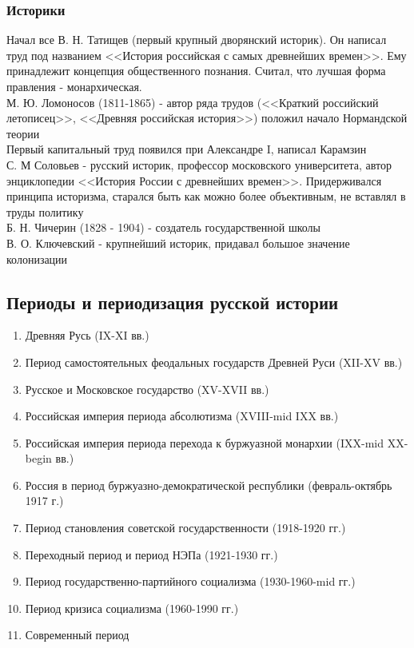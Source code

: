 \documentclass[a4paper, 11pt, oneside]{article}
\begin{document}
\subsubsection{Историки}
Начал все В. Н. Татищев (первый крупный дворянский историк). Он написал труд под названием 
<<История российская с самых древнейших времен>>. Ему принадлежит концепция общественного познания. Считал, что лучшая форма правления - монархическая.\\
М. Ю. Ломоносов (1811-1865) - автор ряда трудов (<<Краткий российский летописец>>, <<Древняя российская история>>) положил начало Нормандской теории\\
Первый капитальный труд появился при Александре I, написал Карамзин\\
С. М Соловьев - русский историк, профессор московского университета, автор энциклопедии <<История России с древнейших времен>>. Придерживался принципа историзма, старался быть как можно более объективным, не вставлял в труды политику\\
Б. Н. Чичерин (1828 - 1904) - создатель государственной школы\\
В. О. Ключевский - крупнейший историк, придавал большое значение колонизации
\subsection{Периоды и периодизация русской истории}
\begin{enumerate}
	\item Древняя Русь (IX-XI вв.)
	\item Период самостоятельных феодальных государств Древней Руси (XII-XV вв.)
	\item Русское и Московское государство (XV-XVII вв.)
	\item Российская империя периода абсолютизма (XVIII-mid IXX вв.)
	\item Российская империя периода перехода к буржуазной монархии (IXX-mid XX-begin вв.)
	\item Россия в период буржуазно-демократической республики (февраль-октябрь 1917 г.)
	\item Период становления советской государственности (1918-1920 гг.)
	\item Переходный период и период НЭПа (1921-1930 гг.)
	\item Период государственно-партийного социализма (1930-1960-mid гг.)
	\item Период кризиса социализма (1960-1990 гг.)
	\item Современный период
\end{enumerate}
\newpage
\end{document}
